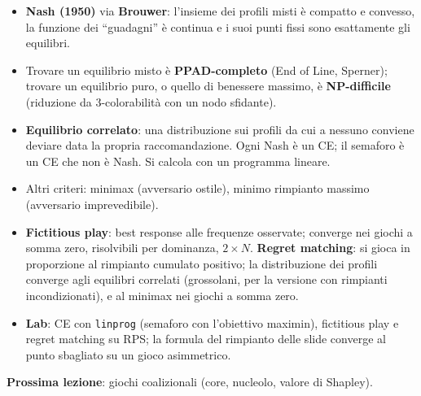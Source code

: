 \begin{riepilogo}
\begin{itemize}
  \item \textbf{Nash (1950)} via \textbf{Brouwer}: l'insieme dei profili misti è compatto
        e convesso, la funzione dei ``guadagni'' è continua e i suoi punti fissi sono
        esattamente gli equilibri.
  \item Trovare un equilibrio misto è \textbf{PPAD-completo} (End of Line, Sperner);
        trovare un equilibrio puro, o quello di benessere massimo, è \textbf{NP-difficile}
        (riduzione da 3-colorabilità con un nodo sfidante).
  \item \textbf{Equilibrio correlato}: una distribuzione sui profili da cui a nessuno
        conviene deviare data la propria raccomandazione. Ogni Nash è un CE; il semaforo è
        un CE che non è Nash. Si calcola con un programma lineare.
  \item Altri criteri: minimax (avversario ostile), minimo rimpianto massimo
        (avversario imprevedibile).
  \item \textbf{Fictitious play}: best response alle frequenze osservate; converge nei
        giochi a somma zero, risolvibili per dominanza, $2\times N$.
        \textbf{Regret matching}: si gioca in proporzione al rimpianto cumulato positivo;
        la distribuzione dei profili converge agli equilibri correlati (grossolani, per la
        versione con rimpianti incondizionati), e al minimax nei giochi a somma zero.
  \item \textbf{Lab}: CE con \texttt{linprog} (semaforo con l'obiettivo maximin),
        fictitious play e regret matching su RPS; la formula del rimpianto delle slide
        converge al punto sbagliato su un gioco asimmetrico.
\end{itemize}
\textbf{Prossima lezione}: giochi coalizionali (core, nucleolo, valore di Shapley).
\end{riepilogo}
